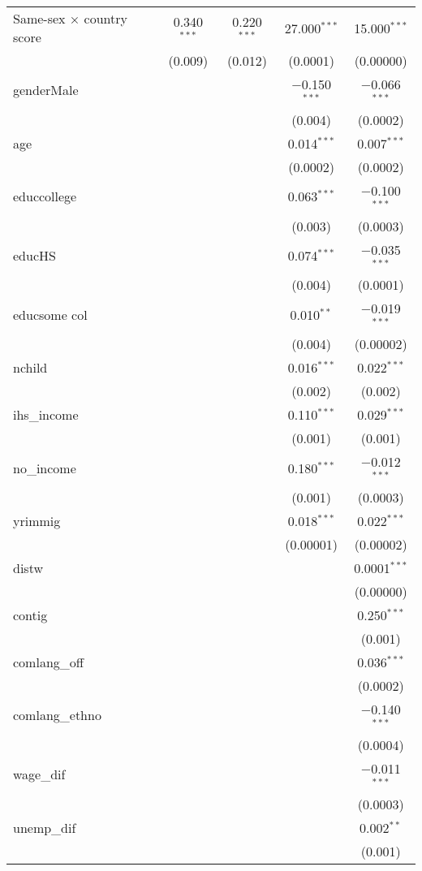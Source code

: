 \documentclass[
  11pt,
]{article}
\begin{document}
\begin{table}[!htbp]
\begin{tabular}{@{\extracolsep{5pt}}lcccc}
  Same-sex × country score & 0.340$^{***}$ & 0.220$^{***}$ & 27.000$^{***}$ & 15.000$^{***}$ \\ 
  & (0.009) & (0.012) & (0.0001) & (0.00000) \\ 
  genderMale &  &  & $-$0.150$^{***}$ & $-$0.066$^{***}$ \\ 
  &  &  & (0.004) & (0.0002) \\ 
  age &  &  & 0.014$^{***}$ & 0.007$^{***}$ \\ 
  &  &  & (0.0002) & (0.0002) \\ 
  educcollege &  &  & 0.063$^{***}$ & $-$0.100$^{***}$ \\ 
  &  &  & (0.003) & (0.0003) \\ 
  educHS &  &  & 0.074$^{***}$ & $-$0.035$^{***}$ \\ 
  &  &  & (0.004) & (0.0001) \\ 
  educsome col &  &  & 0.010$^{**}$ & $-$0.019$^{***}$ \\ 
  &  &  & (0.004) & (0.00002) \\ 
  nchild &  &  & 0.016$^{***}$ & 0.022$^{***}$ \\ 
  &  &  & (0.002) & (0.002) \\ 
  ihs\_income &  &  & 0.110$^{***}$ & 0.029$^{***}$ \\ 
  &  &  & (0.001) & (0.001) \\ 
  no\_income &  &  & 0.180$^{***}$ & $-$0.012$^{***}$ \\ 
  &  &  & (0.001) & (0.0003) \\ 
  yrimmig &  &  & 0.018$^{***}$ & 0.022$^{***}$ \\ 
  &  &  & (0.00001) & (0.00002) \\ 
  distw &  &  &  & 0.0001$^{***}$ \\ 
  &  &  &  & (0.00000) \\ 
  contig &  &  &  & 0.250$^{***}$ \\ 
  &  &  &  & (0.001) \\ 
  comlang\_off &  &  &  & 0.036$^{***}$ \\ 
  &  &  &  & (0.0002) \\ 
  comlang\_ethno &  &  &  & $-$0.140$^{***}$ \\ 
  &  &  &  & (0.0004) \\ 
  wage\_dif &  &  &  & $-$0.011$^{***}$ \\ 
  &  &  &  & (0.0003) \\ 
  unemp\_dif &  &  &  & 0.002$^{**}$ \\ 
  &  &  &  & (0.001) \\ 

\end{tabular}
\end{table}
\end{document}
